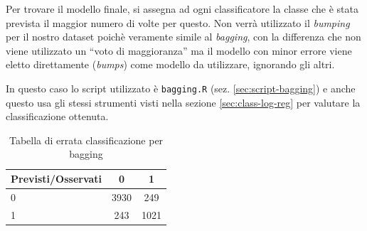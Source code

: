 Per trovare il modello finale, si assegna ad ogni classificatore la classe che
è stata prevista il maggior numero di volte per questo. Non verrà utilizzato il
\emph{bumping} per il nostro dataset poichè veramente simile al \emph{bagging},
con la differenza che non viene utilizzato un ``voto di maggioranza'' ma il
modello con minor errore viene eletto direttamente (\emph{bumps}) come modello
da utilizzare, ignorando gli altri.

In questo caso lo script utilizzato è \texttt{bagging.R} (sez.
\ref{sec:script-bagging}) e anche questo usa gli stessi strumenti visti nella
sezione \ref{sec:class-log-reg} per valutare la classificazione ottenuta.

\begin{table}[H]
\begin{center}
\begin{tabular}{ | l || c | c | }
  \hline
    Previsti/Osservati & 0 & 1 \\ \hline \hline
    0 & 3930 & 249 \\ \hline
    1 & 243 & 1021 \\ \hline
\end{tabular}
  \caption{Tabella di errata classificazione per bagging}
\end{center}
\end{table}

